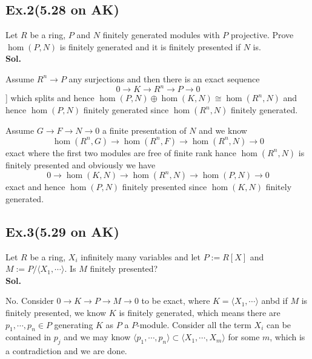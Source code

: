 \documentclass[lang=en,11pt,a4paper,citestyle =authoryear]{elegantpaper}
\begin{document}
\subsection*{Ex.2(5.28 on AK)} 
Let $R$ be a ring, $P$ and $N$ finitely generated modules with $P$ projective. Prove $\hom(P,N)$ is finitely generated and it is finitely presented if $N$ is.
\vspace{0.5em}\\
\textbf{Sol.} \par
Assume $R^n\to P$ any surjections and then there is an exact sequence
\[0\to K \to R^n \to P \to 0\]]
which splits and hence $\hom(P,N) \oplus \hom(K,N) \cong \hom(R^n,N)$ and hence $\hom(P,N)$ finitely generated since $\hom(R^n,N)$ finitely generated.\par
Assume $G\to F\to N \to 0$ a finite presentation of $N$ and we know
\[
\hom(R^n,G) \to \hom(R^n,F) \to \hom(R^n,N) \to 0
\]
exact where the first two modules are free of finite rank hance $\hom(R^n,N)$ is finitely presented and obviously we have
\[
0\to \hom(K,N) \to \hom(R^n,N) \to \hom(P,N) \to 0
\]
exact and hence $\hom(P,N)$ finitely presented since $\hom(K,N)$ finitely generated.
\par 
\vspace{0.5em}

\subsection*{Ex.3(5.29 on AK)} 
Let $R$ be a ring, $X_i$ infinitely many variables and let $P:=R[X]$ and $M:=P/\langle X_1,\cdots\rangle$. Is $M$ finitely presented?
\vspace{0.5em}\\
\textbf{Sol.} \par
No. Consider $0 \to K \to P \to M \to 0$ to be exact, where $K = \langle X_1,\cdots\rangle$ anbd if $M$ is finitely presented, we know $K$ is finitely generated, which means there are $p_1,\cdots,p_n \in P$ generating $K$ as $P$ a $P$-module. Consider all the term $X_i$ can be contained in $p_j$ and we may know $\langle p_1,\cdots, p_n\rangle \subset \langle X_1,\cdots, X_m\rangle$ for some $m$, which is a contradiction and we are done. 
\par 
\vspace{0.5em}
\end{document}
